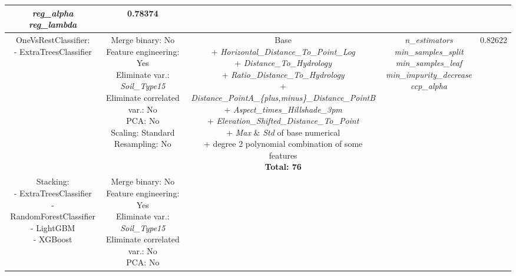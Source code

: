 \documentclass{article}
\begin{document}
\begin{table}[H]
{\begin{tabular}{|c||c|c|c||c|}
{      \textit{reg\_alpha} \\
      \textit{reg\_lambda}} &
    0.78374 \\
  \hline
  \makecell{
    OneVsRestClassifier: \\
    - ExtraTreesClassifier} &
  \makecell{
    Merge binary: No \\
    Feature engineering: Yes \\
    Eliminate var.: \textit{Soil\_Type15} \\
    Eliminate correlated var.: No \\
    PCA: No \\
    Scaling: Standard \\
    Resampling: No} &
  \makecell{
    Base \\
    + \textit{Horizontal\_Distance\_To\_Point\_Log} \\
    + \textit{Distance\_To\_Hydrology} \\
    + \textit{Ratio\_Distance\_To\_Hydrology} \\
    + \textit{Distance\_PointA\_\{plus,minus\}\_Distance\_PointB} \\
    + \textit{Aspect\_times\_Hillshade\_3pm} \\
    + \textit{Elevation\_Shifted\_Distance\_To\_Point} \\
    + \textit{Max} \& \textit{Std} of base numerical \\
    + degree 2 polynomial combination of some features\footnotemark[3] \\
    \textbf{Total: 76}} &
  \makecell{
    \textit{n\_estimators} \\
    \textit{min\_samples\_split} \\
    \textit{min\_samples\_leaf} \\
    \textit{min\_impurity\_decrease} \\
    \textit{ccp\_alpha}} &
  0.82622 \\
  \hline
  \makecell{
    Stacking: \\
    - ExtraTreesClassifier \\
    - RandomForestClassifier \\
    - LightGBM \\
    - XGBoost} &
  \makecell{
    Merge binary: No \\
    Feature engineering: Yes \\
    Eliminate var.: \textit{Soil\_Type15} \\
    Eliminate correlated var.: No \\
    PCA: No \\
}
\end{tabular}}
\end{table}
\end{document}
